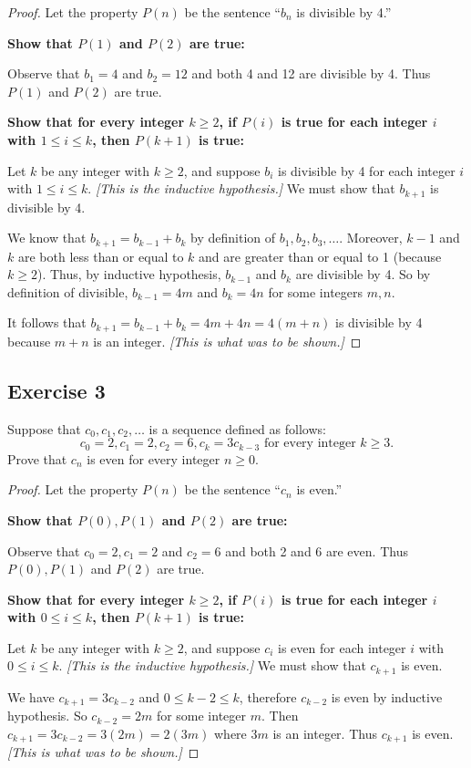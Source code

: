 \documentclass[14pt]{extarticle}
\begin{document}
\begin{proof}
Let the property $P(n)$ be the sentence “$b_n$ is divisible by 4.”

{\bf Show that $P(1)$ and $P(2)$ are true:}

Observe that $b_1 = 4$ and $b_2 = 12$ and both 4 and 12 are divisible by 4. Thus $P(1)$ and $P(2)$ are true.

{\bf Show that for every integer $k \geq 2$, if $P(i)$ is true for each integer $i$ with $1 \leq i \leq k$, then $P(k + 1)$ is true:}

Let $k$ be any integer with $k \geq 2$, and suppose $b_i$ is divisible by 4 for each integer $i$ with $1 \leq i \leq k$. {\it [This is the inductive hypothesis.]} We must show that $b_{k+1}$ is divisible by 4. 

We know that $b_{k+1} = b_{k-1} + b_k$ by definition of $b_1, b_2, b_3, \ldots$. Moreover, $k - 1$ and $k$ are both less than or equal to $k$ and are greater than or equal to 1 (because $k \geq 2$). Thus, by inductive hypothesis, $b_{k-1}$ and $b_k$ are divisible by 4. So by definition of divisible, $b_{k-1} = 4m$ and $b_k = 4n$ for some integers $m,n$. 

It follows that $b_{k+1} = b_{k-1} + b_k = 4m + 4n = 4(m+n)$ is divisible by 4 because $m+n$ is an integer. {\it [This is what was to be shown.]}
\end{proof}

\subsection{Exercise 3}
Suppose that $c_0, c_1, c_2, \ldots$ is a sequence defined
as follows:
\[
c_0 = 2, c_1 = 2, c_2 = 6, c_k = 3c_{k-3} \text{ for every integer $k \geq 3$.}
\]
Prove that $c_n$ is even for every integer $n \geq 0$.

\begin{proof}
Let the property $P(n)$ be the sentence “$c_n$ is even.”

{\bf Show that $P(0), P(1)$ and $P(2)$ are true:}

Observe that $c_0 = 2, c_1 = 2$ and $c_2 = 6$ and both 2 and 6 are even. Thus $P(0), P(1)$ and $P(2)$ are true.

{\bf Show that for every integer $k \geq 2$, if $P(i)$ is true for each integer $i$ with $0 \leq i \leq k$, then $P(k + 1)$ is true:}

Let $k$ be any integer with $k \geq 2$, and suppose $c_i$ is even for each integer $i$ with $0 \leq i \leq k$. {\it [This is the inductive hypothesis.]} We must show that $c_{k+1}$ is even. 

We have $c_{k+1} = 3c_{k-2}$ and $0 \leq k-2 \leq k$, therefore $c_{k-2}$ is even by inductive hypothesis. So $c_{k-2} = 2m$ for some integer $m$. Then $c_{k+1} = 3c_{k-2} = 3(2m) = 2(3m)$ where $3m$ is an integer. Thus $c_{k+1}$ is even. {\it [This is what was to be shown.]}
\end{proof}
\end{document}
